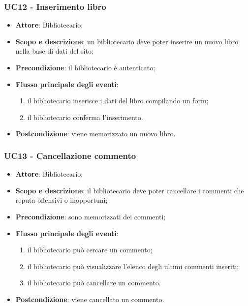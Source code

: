\subsubsection{UC12 - Inserimento libro}
\begin{itemize}
	\item \textbf{Attore}: Bibliotecario;
	\item \textbf{Scopo e descrizione}: un bibliotecario deve poter inserire un nuovo libro nella base di dati del sito;
	\item \textbf{Precondizione}: il bibliotecario è autenticato; 
	\item \textbf{Flusso principale degli eventi}:
	\begin{enumerate}
		\item il bibliotecario inserisce i dati del libro compilando un form;
		\item il bibliotecario conferma l'inserimento.
	\end{enumerate} 
	\item \textbf{Postcondizione}: viene memorizzato un nuovo libro.
\end{itemize}

\subsubsection{UC13 - Cancellazione commento}
\begin{itemize}
	\item \textbf{Attore}: Bibliotecario;
	\item \textbf{Scopo e descrizione}: il bibliotecario deve poter cancellare i commenti che reputa offensivi o inopportuni;
	\item \textbf{Precondizione}: sono memorizzati dei commenti;
	\item \textbf{Flusso principale degli eventi}:
	\begin{enumerate}
		\item il bibliotecario può cercare un commento;
		\item il bibliotecario può visualizzare l'elenco degli ultimi commenti inseriti;
		\item il bibliotecario può cancellare un commento.
	\end{enumerate} 
	\item \textbf{Postcondizione}: viene cancellato un commento.
\end{itemize}

